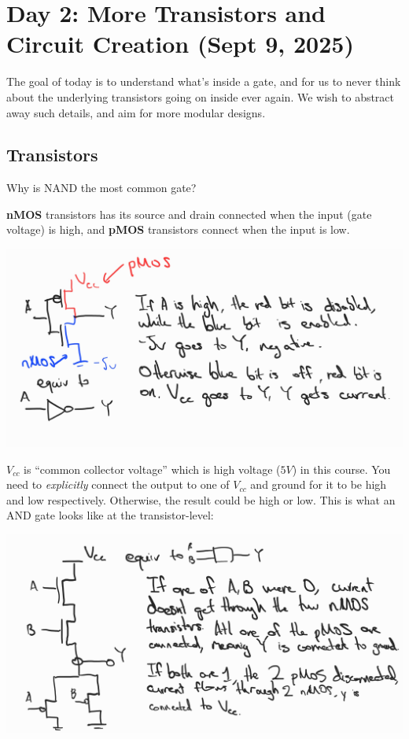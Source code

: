 \section{Day 2: More Transistors and Circuit Creation (Sept 9, 2025)}

The goal of today is to understand what's inside a gate, and for us to never think about the underlying transistors going on inside ever again. We wish to abstract away such details, and aim for more modular designs. 

\subsection{Transistors}

\begin{problem}
Why is NAND the most common gate?
\end{problem}

\textbf{nMOS} transistors has its source and drain connected when the input (gate voltage) is high, and \textbf{pMOS} transistors connect when the input is low.

\includegraphics{csc258/figures/nmospmosnotgate.jpg}

$V_{cc}$ is ``common collector voltage'' which is high voltage ($5V$) in this course. You need to \textit{explicitly} connect the output to one of $V_{cc}$ and ground for it to be high and low respectively. Otherwise, the result could be high or low. This is what an AND gate looks like at the transistor-level:

\includegraphics{csc258/figures/andgate.jpg}

